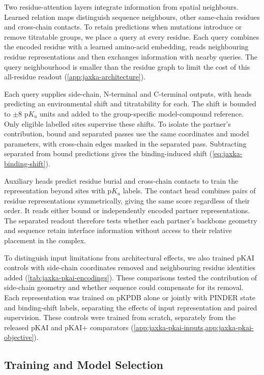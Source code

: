 Two residue-attention layers integrate information from spatial neighbours. Learned relation maps distinguish sequence neighbours, other same-chain residues and cross-chain contacts. To retain predictions when mutations introduce or remove titratable groups, we place a query at every residue. Each query combines the encoded residue with a learned amino-acid embedding, reads neighbouring residue representations and then exchanges information with nearby queries. The query neighbourhood is smaller than the residue graph to limit the cost of this all-residue readout (\cref{app:jaxka-architecture}).

Each query supplies side-chain, N-terminal and C-terminal outputs, with heads predicting an environmental shift and titratability for each. The shift is bounded to $\pm8$ $\mathrm{p}K_a$ units and added to the group-specific model-compound reference. Only eligible labelled sites supervise these shifts. To isolate the partner's contribution, bound and separated passes use the same coordinates and model parameters, with cross-chain edges masked in the separated pass. Subtracting separated from bound predictions gives the binding-induced shift (\cref{eq:jaxka-binding-shift}).

Auxiliary heads predict residue burial and cross-chain contacts to train the representation beyond sites with $\mathrm{p}K_a$ labels. The contact head combines pairs of residue representations symmetrically, giving the same score regardless of their order. It reads either bound or independently encoded partner representations. The separated readout therefore tests whether each partner's backbone geometry and sequence retain interface information without access to their relative placement in the complex.

To distinguish input limitations from architectural effects, we also trained pKAI controls with side-chain coordinates removed and neighbouring residue identities added (\cref{tab:jaxka-pkai-encodings}). These comparisons tested the contribution of side-chain geometry and whether sequence could compensate for its removal. Each representation was trained on pKPDB alone or jointly with PINDER state and binding-shift labels, separating the effects of input representation and paired supervision. These controls were trained from scratch, separately from the released pKAI and pKAI+ comparators (\cref{app:jaxka-pkai-inputs,app:jaxka-pkai-objective}).

\subsection{Training and Model Selection}
\label{sec:jaxka-training}

